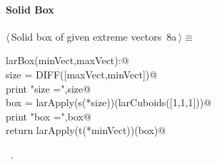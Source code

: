 \documentclass[11pt,oneside]{article}	%
\begin{document}
\paragraph{Solid Box}
\begin{flushleft} \small \label{scrap13}
\protect{}$\langle\,$Solid box of given extreme vectors\nobreak\ {\footnotesize 8a}$\,\rangle\equiv$
\vspace{-1ex}
\begin{list}{}{} \item
\mbox{}\verb@def larBox(minVect,maxVect):@\\
\mbox{}\verb@   size = DIFF([maxVect,minVect])@\\
\mbox{}\verb@   print "size =",size@\\
\mbox{}\verb@   box = larApply(s(*size))(larCuboids([1,1,1]))@\\
\mbox{}\verb@   print "box =",box@\\
\mbox{}\verb@   return larApply(t(*minVect))(box)@\\
\mbox{}\verb@@{\NWsep}
\end{list}
\vspace{-1ex}
\footnotesize\addtolength{\baselineskip}{-1ex}
\begin{list}{}{\setlength{\itemsep}{-\parsep}\setlength{\itemindent}{-\leftmargin}}
\item \NWtxtMacroRefIn\ .
\end{list}
\end{flushleft}
\end{document}
